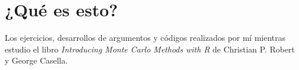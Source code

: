 \chapter{¿Qué es esto?}

Los ejercicios, desarrollos de argumentos 
y códigos realizados por mí mientras estudio el libro
\textit{Introducing Monte Carlo Methods with R}
de Christian P. Robert y George Casella.
